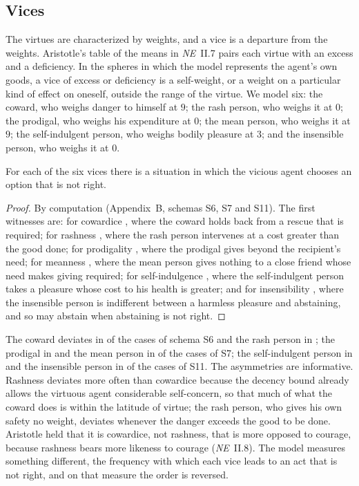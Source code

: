 \documentclass{situationist-preprint}
\begin{document}
\subsection{Vices}

The virtues are characterized by weights, and a vice is a departure from the weights. Aristotle's table of the means in \emph{NE}~II.7 pairs each virtue with an excess and a deficiency. In the spheres in which the model represents the agent's own goods, a vice of excess or deficiency is a self-weight, or a weight on a particular kind of effect on oneself, outside the range of the virtue. We model six: the coward, who weighs danger to himself at $9$; the rash person, who weighs it at $0$; the prodigal, who weighs his expenditure at $0$; the mean person, who weighs it at $9$; the self-indulgent person, who weighs bodily pleasure at $3$; and the insensible person, who weighs it at $0$.

\begin{proposition}\label{p:vices}
For each of the six vices there is a situation in which the vicious agent chooses an option that is not right.
\end{proposition}

\begin{proof}
By computation (Appendix~B, schemas S6, S7 and S11). The first witnesses are: for cowardice \texttt{\stfirstvicecoward}, where the coward holds back from a rescue that is required; for rashness \texttt{\stfirstvicerash}, where the rash person intervenes at a cost greater than the good done; for prodigality \texttt{\stfirstviceprodigal}, where the prodigal gives beyond the recipient's need; for meanness \texttt{\stfirstvicemean}, where the mean person gives nothing to a close friend whose need makes giving required; for self-indulgence \texttt{\stfirstviceselfindulgent}, where the self-indulgent person takes a pleasure whose cost to his health is greater; and for insensibility \texttt{\stfirstviceinsensible}, where the insensible person is indifferent between a harmless pleasure and abstaining, and so may abstain when abstaining is not right.
\end{proof}

The coward deviates in \stnvicecoward{} of the \stnschsix{} cases of schema S6 and the rash person in \stnvicerash{}; the prodigal in \stnviceprodigal{} and the mean person in \stnvicemean{} of the \stnschseven{} cases of S7; the self-indulgent person in \stnviceselfindulgent{} and the insensible person in \stnviceinsensible{} of the \stnscheleven{} cases of S11. The asymmetries are informative. Rashness deviates more often than cowardice because the decency bound already allows the virtuous agent considerable self-concern, so that much of what the coward does is within the latitude of virtue; the rash person, who gives his own safety no weight, deviates whenever the danger exceeds the good to be done. Aristotle held that it is cowardice, not rashness, that is more opposed to courage, because rashness bears more likeness to courage (\emph{NE}~II.8). The model measures something different, the frequency with which each vice leads to an act that is not right, and on that measure the order is reversed.
\end{document}

